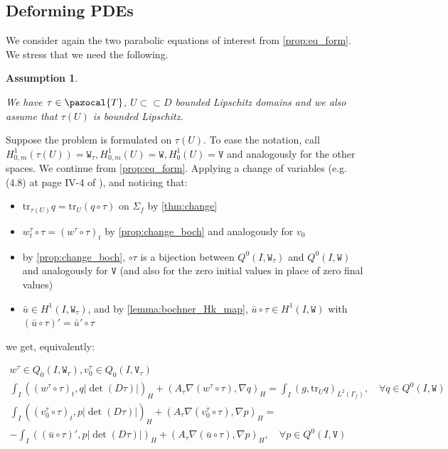 \documentclass[english,a4paper,10pt,oneside]{scrbook}	%
\theoremstyle{break}
\newtheorem{ass}[equation]{Assumption}
\theoremstyle{remark}
\newcommand{\tr}{\text{tr}}
\newcommand{\cc}{\subset\subset}
\newcommand{\cT}{\pazocal{T}}
\newcommand{\tw}[1]{\texttt{#1}}
\begin{document}
\begin{appendices}
\section{Deforming PDEs}

We consider again the two parabolic equations of interest from \cref{prop:eq_form}. We stress that we need the following.

\begin{ass}
\label{ass:pull}

We have $\tau \in \cT$, $U\cc D$ bounded Lipschitz domains and we also assume that $\tau(U)$ is bounded Lipschitz.
\end{ass}

Suppose the problem is formulated on $\tau(U)$. To ease the notation, call $H^1_{0,m}(\tau(U))=\tw{W}_\tau, H^1_{0,m}(U)=\tw{W}, H^1_0(U)=\tw{V}$ and analogously for the other spaces.
We continue from \cref{prop:eq_form}. Applying a change of variables (e.g. (4.8) at page IV-4 of \cite{murat}), and noticing that:

\begin{itemize}
	\item $\tr_{\tau(U)} q = \tr_U(q\circ \tau)$ on $\Sigma_f$ by \cref{thm:change}
	\item $w_t^\tau\circ \tau = (w^\tau\circ \tau)_t$ by \cref{prop:change_boch} and analogously for $v_0$
	\item by \cref{prop:change_boch}, $\circ \tau$ is a bijection between $Q^0(I,\tw{W}_\tau)$ and $Q^0(I,\tw{W})$ and analogously for $\tw{V}$ (and also for the zero initial values in place of zero final values)
	\item $\bar{u} \in H^1(I,\tw{W}_\tau)$, and by \cref{lemma:bochner_Hk_map}, $\bar{u}\circ \tau \in H^1(I,\tw{W})$ with $(\bar{u}\circ \tau )' = \bar{u}'\circ \tau $
\end{itemize}

we get, equivalently:

\begin{align*}
w^\tau \in Q_0(I, \tw{W}_\tau), v_0^\tau \in Q_0(I,\tw{V}_\tau) \\
\int_I ( (w^\tau\circ \tau)_t , q |\det(D\tau)|)_H+ (A_\tau\nabla (w^\tau\circ \tau), \nabla q)_{H} = \int_I(g,\tr_{U} q)_{L^2(\Gamma_f)}, \quad \forall q \in Q^0(I, \tw{W}) \\
\int_I ( (v_0^\tau\circ \tau)_t,p |\det(D\tau)|)_H + (A_\tau \nabla (v_0^\tau\circ \tau), \nabla p)_{H}=\\-\int_I((\bar{u}\circ \tau)',p|\det(D\tau)|)_{H}+(A_\tau \nabla (\bar{u} \circ \tau), \nabla p)_{H}, \quad \forall p \in Q^0(I, \tw{V})
\end{align*}


\end{appendices}
\end{document}
